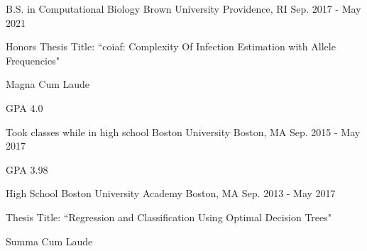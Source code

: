 

\begin{cventries}

  \cventry
    {B.S. in Computational Biology} %
    {Brown University} %
    {Providence, RI} %
    {Sep. 2017 - May 2021} %
    {
      \begin{cvitems}
        \item{Honors Thesis Title: ``coiaf: Complexity Of Infection Estimation
        with Allele Frequencies"}
        \item {Magna Cum Laude}
        \item {GPA 4.0}
      \end{cvitems}
    }
  
  \cventry
    {Took classes while in high school} %
    {Boston University} %
    {Boston, MA} %
    {Sep. 2015 - May 2017} %
    {
      \begin{cvitems}
        \item {GPA 3.98}
      \end{cvitems}
    }
   
  \cventry
    {High School} %
    {Boston University Academy} %
    {Boston, MA} %
    {Sep. 2013 - May 2017} %
    {
      \begin{cvitems}
        \item {Thesis Title: ``Regression and Classification Using Optimal
        Decision Trees"}
        \item {Summa Cum Laude}
      \end{cvitems}
    }
    
\end{cventries}

